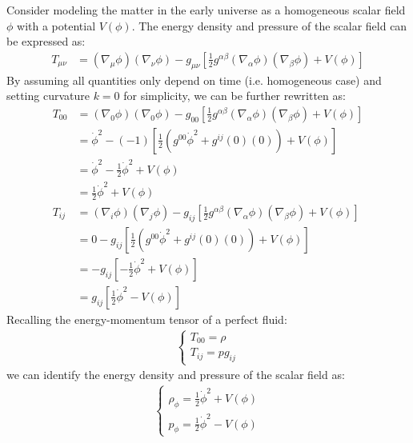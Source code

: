 \bigskip \noindent
\begin{foundation}
    Consider modeling the matter in the early universe as a homogeneous scalar field $\phi$ with a potential $V(\phi)$. The energy density and pressure of the scalar field can be expressed as:
    \begin{align*}
        T_{\mu \nu} &= (\nabla_\mu \phi)(\nabla_\nu \phi) - g_{\mu \nu} \left[
            \frac{1}{2} g^{\alpha \beta} (\nabla_\alpha \phi)(\nabla_\beta \phi) + V(\phi)
        \right]
    \end{align*}
    By assuming all quantities only depend on time (i.e. homogeneous case) and setting curvature $k=0$ for simplicity, we can be further rewritten as:
    \begin{align*}
        T_{00} &= (\nabla_0 \phi)(\nabla_0 \phi) - g_{00} \left[
            \frac{1}{2} g^{\alpha \beta} (\nabla_\alpha \phi)(\nabla_\beta \phi) + V(\phi) \right] \\ 
            &= \dot{\phi}^2 - (-1) \left[ \frac{1}{2} \left(
            g^{00} \dot{\phi}^2 + g^{ij} (0)(0) \right) + V(\phi) \right] \\
            &= \dot{\phi}^2 - \frac{1}{2} \dot{\phi}^2 + V(\phi) \\
            &= \frac{1}{2} \dot{\phi}^2 + V(\phi) \\
        T_{ij} &= (\nabla_i \phi)(\nabla_j \phi) - g_{ij} \left[
            \frac{1}{2} g^{\alpha \beta} (\nabla_\alpha \phi)(\nabla_\beta \phi) + V(\phi) \right] \\
            &= 0 - g_{ij} \left[ \frac{1}{2} \left(
            g^{00} \dot{\phi}^2 + g^{ij} (0)(0) \right) + V(\phi) \right] \\
            &= - g_{ij} \left[ - \frac{1}{2} \dot{\phi}^2 + V(\phi) \right] \\
            &= g_{ij}\left[ \frac{1}{2} \dot{\phi}^2 - V(\phi) \right]
    \end{align*}
    Recalling the energy-momentum tensor of a perfect fluid:
    \begin{align*}
        \begin{cases}
            T_{00} = \rho \\
            T_{ij} = p g_{ij}
        \end{cases}
    \end{align*}
    we can identify the energy density and pressure of the scalar field as:
    \begin{align*}
        \begin{cases}
            \rho_\phi = \frac{1}{2} \dot{\phi}^2 + V(\phi) \\
            p_\phi = \frac{1}{2} \dot{\phi}^2 - V(\phi)
        \end{cases}
    \end{align*}


\end{foundation}

